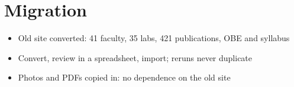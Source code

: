 \documentclass[11pt,a4paper]{article}
\begin{document}
\section*{Migration}
\begin{itemize}
  \item Old site converted: 41 faculty, 35 labs, 421 publications, OBE and syllabus
  \item Convert, review in a spreadsheet, import; reruns never duplicate
  \item Photos and PDFs copied in: no dependence on the old site
\end{itemize}
\end{document}
